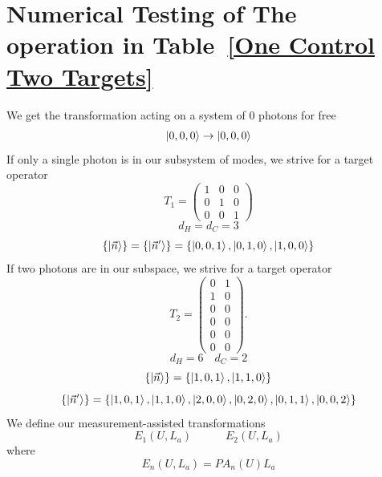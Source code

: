 \documentclass[aps,pra,twocolumn,showpacs,superscriptaddress,floatfix,10pt]{revtex4}
\begin{document}
\section{Numerical Testing of The operation in Table~\ref{One Control Two Targets}}
\label{Section Numerical Testing}
We get the transformation acting on a system of 0 photons for free
\begin{equation}
\ket{0,0,0} \rightarrow \ket{0,0,0}
\end{equation}
If only a single photon is in our subsystem of modes, we strive for a target operator
\begin{equation}
\label{T1 1C2T}
T_1=	\begin{pmatrix} 1 & 0 & 0  \\ 0 & 1 & 0  \\ 0 & 0 & 1   \end{pmatrix}  
\end{equation}
\begin{equation}
d_H = d_C = 3
\end{equation}
\begin{equation}
\{ \ket{\vec{n}} \} = \{ \ket{\vec{n}^\prime} \} = \{ \ket{0,0,1},\ket{0,1,0},\ket{1,0,0} \}
\end{equation}
If two photons are in our subspace, we strive for a target operator 
\begin{equation}
\label{T2 1C2T}
T_2=\begin{pmatrix} 0 & 1  \\ 1 & 0  \\ 0 & 0 \\ 0 & 0 \\ 0 & 0 \\ 0 & 0   \end{pmatrix}.  
\end{equation}
\begin{equation}
d_H = 6 \quad d_C = 2
\end{equation}
\begin{equation}
\{ \ket{\vec{n}} \} = \{ \ket{1,0,1},\ket{1,1,0} \}
\end{equation}
\begin{equation}
\{ \ket{\vec{n}^\prime } \} = \{ \ket{1,0,1},\ket{1,1,0},\ket{2,0,0},\ket{0,2,0},\ket{0,1,1},\ket{0,0,2} \}
\end{equation}
We define our measurement-assisted transformations 
\begin{equation}
E_1(U,L_a) \quad \quad \quad E_2(U,L_a)
\end{equation}
where
\begin{equation}
E_n(U,L_a) = P A_n(U) L_a
\end{equation}
\end{document}
